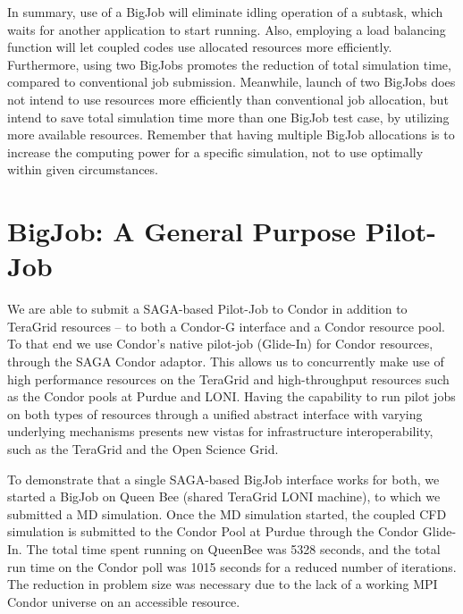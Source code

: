 \documentclass[conference,final]{IEEEtran}
\begin{document}
In summary, use of a BigJob will eliminate idling operation of a subtask, which waits for another application to start running. Also, employing a load balancing function will let coupled codes use allocated resources more efficiently. Furthermore, using two BigJobs promotes the reduction of total simulation time, compared to conventional job submission. Meanwhile, launch of two BigJobs does not intend to use resources more efficiently than conventional job allocation, but intend to save total simulation time more than one BigJob test case, by utilizing more available resources. Remember that having multiple BigJob allocations is to increase the computing power for a specific simulation, not to use optimally within given circumstances.


\section{BigJob: A General Purpose Pilot-Job}

We are able to submit a SAGA-based Pilot-Job to Condor in addition to TeraGrid resources -- to both a Condor-G interface and a Condor resource pool. To that end we use Condor's native pilot-job (Glide-In) for Condor resources, through the SAGA Condor adaptor. This allows us to concurrently make use of high performance resources on the TeraGrid and high-throughput resources such as the Condor pools at Purdue and LONI. Having the capability to run pilot jobs on both types of resources through a unified abstract interface with varying underlying mechanisms presents new vistas for infrastructure interoperability, such as the TeraGrid and the Open Science Grid.

To demonstrate that a single SAGA-based BigJob interface works for both, we started a BigJob on Queen Bee (shared TeraGrid LONI machine), to which we submitted a MD simulation. Once the MD simulation started, the coupled CFD simulation is submitted to the Condor Pool at Purdue through the Condor Glide-In. The total time spent running on QueenBee was 5328 seconds, and the total run time on the Condor poll was 1015 seconds for a reduced number of iterations. The reduction in problem size was necessary due to the lack of a working MPI Condor universe on an accessible resource.
\end{document}
